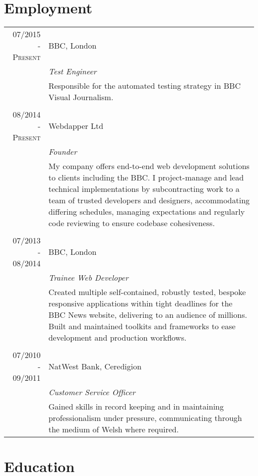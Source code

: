 \documentclass[class=article, crop=false]{standalone}
\begin{document}
\section{Employment}
\begin{tabular}{r|p{11cm}}
\textsc{07/2015 - Present} & BBC, London
\\&\emph{Test Engineer}
\\&\footnotesize{Responsible for the automated testing strategy in BBC Visual Journalism.}
\\\multicolumn{2}{c}{} \\
\textsc{08/2014 - Present} & Webdapper Ltd
\\&\emph{Founder}
\\&\footnotesize{My company offers end-to-end web development solutions to clients including the BBC. I project-manage and lead technical implementations by subcontracting work to a team of trusted developers and designers, accommodating differing schedules, managing expectations and regularly code reviewing to ensure codebase cohesiveness.}
\\\multicolumn{2}{c}{} \\
\textsc{07/2013 - 08/2014} & BBC, London
\\&\emph{Trainee Web Developer}
\\&\footnotesize{Created multiple self-contained, robustly tested, bespoke responsive applications within tight deadlines for the BBC News website, delivering to an audience of millions. Built and maintained toolkits and frameworks to ease development and production workflows.}
\\\multicolumn{2}{c}{} \\
\textsc{07/2010 - 09/2011} & NatWest Bank, Ceredigion
\\&\emph{Customer Service Officer}
\\&\footnotesize{Gained skills in record keeping and in maintaining professionalism under pressure, communicating through the medium of Welsh where required.}
\end{tabular}

\section{Education}
\end{document}

